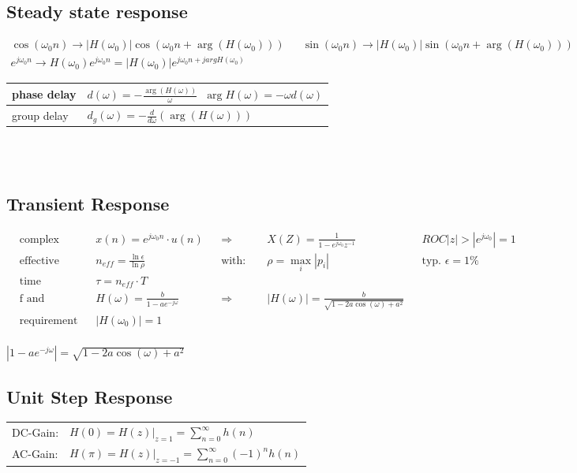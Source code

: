 \subsection{Steady state response}
\begin{align*}
  \cos(\omega_0 n) \rightarrow \left|H(\omega_0) \right| \cos(\omega_0 n + \arg(H(\omega_0))) &&
  \sin(\omega_0 n) \rightarrow \left|H(\omega_0) \right| \sin(\omega_0 n + \arg(H(\omega_0))) \\
  e^{j\omega_0 n} \rightarrow H(\omega_0)e^{j\omega_0 n} = |H(\omega_0)| e^{j\omega_0 n + j argH(\omega_0)}
\end{align*}


\begin{tabularx}{0.6\textwidth}{|l|X|}
	\hline
	phase delay & $d(\omega) = - \frac{\arg(H(\omega))}{\omega}$\ \qquad $\arg H(\omega) = -\omega d(\omega)$
	\\ \hline 
	group delay & $d_g(\omega) = -\frac{d}{d\omega}(\arg(H(\omega)))$	
	\\ \hline
\end{tabularx}\\ \\

\subsection{Transient Response}
\begin{align*}
&\text{complex sinuousness:} 
&& x(n) = e^{j \omega_0 n} \cdot u(n) 
&& \Rightarrow 
&& X(Z) = \frac{1}{1-e^{j \omega_0} z^{-1}} 
&& ROC |z| > |e^{j\omega_0}|=1\\
%
&\text{effective time:} 
&& n_{eff} = \frac{\ln \epsilon}{\ln \rho} 
&&\text{with: }
&&\rho = \max\limits_{i}\left|p_i \right| 
&&\text{typ. } \epsilon = 1\% \\
%
&\text{time constant:}
&&\tau = n_{eff}\cdot T &&&& &&\\
%
&\text{f and magnitude reponses:} 
&& H(\omega)=\frac{b}{1-ae^{-j\omega}} 
&&\Rightarrow 
&&\left| H(\omega)\right| = \frac{b}{\sqrt{1-2a\cos(\omega) + a^2}} &&\\
%
&\text{requirement that:} 
&& |H(\omega_0)|=1 &&&& &&
\end{align*}\\
$\left| 1-a e^{-j\omega}\right| = \sqrt{1-2a\cos(\omega) + a^2}$\\

\subsection{Unit Step Response}
\begin{tabularx}{1\textwidth}{l X}
	DC-Gain: & $H(0) = H(z)|_{z=1}= \sum\limits_{n=0}^{\infty}h(n) $
	\\
	AC-Gain: & $H(\pi) = H(z)|_{z=-1}= \sum\limits_{n=0}^{\infty}(-1)^n h(n) $
\end{tabularx}


